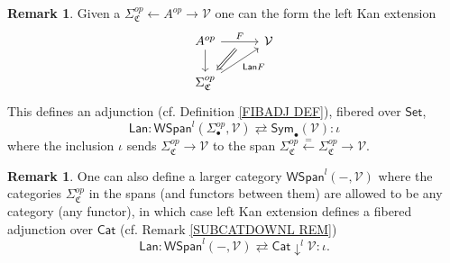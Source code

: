 \documentclass[a4paper,10pt
,draft
]{article}%
\numberwithin{equation}{section}
\numberwithin{figure}{section}
\theoremstyle{definition} %
\newtheorem{remark}[equation]{Remark}%
\newcommand{\1}{\ensuremath{\mathbbm 1}}%
\begin{document}
\begin{remark}\label{LANADJ REM}
Given a $\Sigma^{op}_{\mathfrak{C}} \leftarrow A^{op} \rightarrow \mathcal{V}$
one can the form the left Kan extension
\[
\begin{tikzcd}[column sep = 30pt]
	A^{op}
	\ar{r}[name=U,swap]{}{F} \ar{d} 
&
	\mathcal{V}	
\\
	|[alias=V]|
	\Sigma_{\mathfrak{C}}^{op} 
	\ar{ru}[swap]{\mathsf{Lan} F}
\arrow[Leftarrow, from=V, to=U,shorten >=0.05cm,shorten <=0.05cm]
\end{tikzcd}
\]
This defines an adjunction (cf. Definition \ref{FIBADJ DEF}),
fibered over $\mathsf{Set}$,
\[
	\mathsf{Lan} \colon
	\mathsf{WSpan}^l(\Sigma_{\bullet}^{op},\mathcal{V}) 
\rightleftarrows
	\mathsf{Sym}_{\bullet}(\mathcal{V})
	\colon \iota
\]
where the inclusion $\iota$ sends $\Sigma^{op}_{\mathfrak{C}} \to \mathcal{V}$ 
to the span
$\Sigma^{op}_{\mathfrak{C}} \xleftarrow{=} \Sigma^{op}_{\mathfrak{C}} \to \mathcal{V}$.
\end{remark}



\begin{remark}
One can also define a larger category 
$\mathsf{WSpan}^l( - ,\mathcal{V})$
where the categories $\Sigma_{\mathfrak{C}}^{op}$ in the spans (and functors between them) are allowed to be any category (any functor),
in which case left Kan extension defines a fibered adjunction over 
$\mathsf{Cat}$ (cf. Remark \ref{SUBCATDOWNL REM})
\[
	\mathsf{Lan} \colon
	\mathsf{WSpan}^l( - ,\mathcal{V}) 
\rightleftarrows
	\mathsf{Cat} \downarrow ^l \mathcal{V}
	\colon \iota.
\]
\end{remark}
\end{document}
